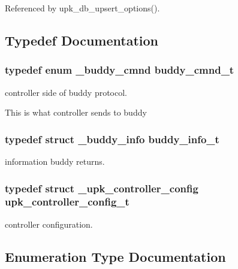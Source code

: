 Referenced by upk\_\-db\_\-upsert\_\-options().



\subsection{Typedef Documentation}
\subsubsection[{buddy\_\-cmnd\_\-t}]{\setlength{\rightskip}{0pt plus 5cm}typedef enum {\bf \_\-buddy\_\-cmnd}  {\bf buddy\_\-cmnd\_\-t}}\label{group__controller_ga535b2f2f45016f1d808a74f3ea665816}


controller side of buddy protocol. 

This is what controller sends to buddy 
\subsubsection[{buddy\_\-info\_\-t}]{\setlength{\rightskip}{0pt plus 5cm}typedef struct {\bf \_\-buddy\_\-info} {\bf buddy\_\-info\_\-t}}\label{group__controller_ga6036c7d3d9131044bcf5a6f7a79106f5}


information buddy returns. 

\subsubsection[{upk\_\-controller\_\-config\_\-t}]{\setlength{\rightskip}{0pt plus 5cm}typedef struct {\bf \_\-upk\_\-controller\_\-config}  {\bf upk\_\-controller\_\-config\_\-t}}\label{group__controller_ga26d3c211cf53e0cd24f9854b2e6fe495}


controller configuration. 



\subsection{Enumeration Type Documentation}
